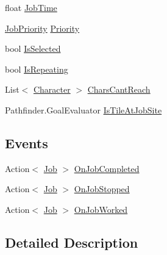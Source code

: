 \begin{DoxyCompactItemize}
\item 
float \hyperlink{class_job_a0d4591bf90e5ca18e52abab59235f945}{Job\+Time}
\item 
\hyperlink{class_job_a9c7ab1966c2a0a1d29a7f5822cbca45a}{Job\+Priority} \hyperlink{class_job_a559abd8b2b3087742adc0ccb1045af7d}{Priority}
\item 
bool \hyperlink{class_job_ac490b750b4dbe8227081665d882f900a}{Is\+Selected}
\item 
bool \hyperlink{class_job_acccc269a1a1a79bbc4bdd8f1c2bd2e2e}{Is\+Repeating}
\item 
List$<$ \hyperlink{class_project_porcupine_1_1_entities_1_1_character}{Character} $>$ \hyperlink{class_job_a24dca863667c9abc692568e7cbeac981}{Chars\+Cant\+Reach}
\item 
Pathfinder.\+Goal\+Evaluator \hyperlink{class_job_a6975b7688a7fd6e7cd74544446ecbe4f}{Is\+Tile\+At\+Job\+Site}
\end{DoxyCompactItemize}
\subsection*{Events}
\begin{DoxyCompactItemize}
\item 
Action$<$ \hyperlink{class_job}{Job} $>$ \hyperlink{class_job_aa151ca0107d45278032e493df5a910a5}{On\+Job\+Completed}
\item 
Action$<$ \hyperlink{class_job}{Job} $>$ \hyperlink{class_job_a68d63ec0351a545efa009e2afcac72f8}{On\+Job\+Stopped}
\item 
Action$<$ \hyperlink{class_job}{Job} $>$ \hyperlink{class_job_a377621134925c1314248ccdd89756e52}{On\+Job\+Worked}
\end{DoxyCompactItemize}


\subsection{Detailed Description}


